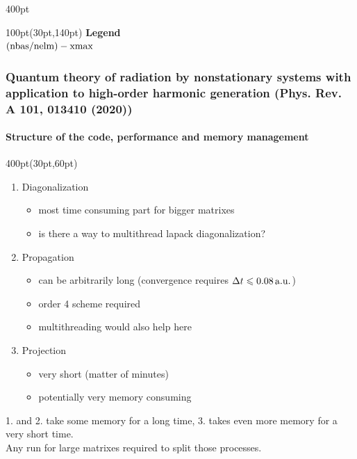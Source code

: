 \begin{frame}
\begin{textblock*}{400pt}
\end{textblock*}


\begin{textblock*}{100pt}(30pt,140pt)
\scriptsize
\textbf{Legend} \\
$\rm (nbas/nelm) - xmax $


\end{textblock*}

\end{frame}



\begin{frame}
\frametitle{Quantum theory of radiation by nonstationary systems 
	with application to high-order harmonic generation
        (Phys. Rev. A 101, 013410 (2020))}
	\framesubtitle{Structure of the code, performance 
         and memory management}
\small

\begin{textblock*}{400pt}(30pt,60pt)
\footnotesize
\begin{enumerate}
\item Diagonalization
\begin{itemize}
\footnotesize
\item[$\bullet$] most time consuming part for bigger matrixes
\item[$\bullet$] is there a way to multithread lapack diagonalization? 
\end{itemize}
\item Propagation
\begin{itemize}
\footnotesize
\item[$\bullet$] can be arbitrarily long 
(convergence requires $\Delta t \leqslant 0.08\,\rm a.u.$)
\item[$\bullet$] order 4 scheme required
\item[$\bullet$] multithreading would also help here
\end{itemize}
\item Projection 
\begin{itemize}
\footnotesize
\item[$\bullet$] very short (matter of minutes)
\item[$\bullet$] potentially very memory consuming
\end{itemize}
\end{enumerate}

\vspace{10pt}

1. and 2. take some memory for a long time, 
3. takes even more memory for a very short time. \\
Any run for large matrixes required to split those processes.


\end{textblock*}

\end{frame}



